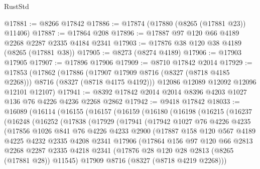 \begin{lexlean}{RustStd}
\begin{coremodule}
@17881 := @8266 @17842
@17886 := @17874 (@17880 (@8265 (@17881 @23)) @11406)
@17887 := @17864 @208
@17896 := @17887 @97 @120 @66 @4189 @2268 @2287 @2335 @4184 @2341
@17903 := @17876 @38 @120 @38 @4189 (@8265 (@17881 @38))
@17905 := @8273 (@8274 @4189)
@17906 := @17903 @17905
@17907 := @17896 @17906
@17909 := @8710 @17842 @2014
@17929 := @17853
    (@17862
      (@17886 (@17907 @17909 @8716 (@8327 (@8718 @4185 @2268))) @8716 (@8327 (@8718 @4175 @4192)))
      @12086
      @12089
      @12092
      @12096
      @12101
      @12107)
@17941 := @8392 @17842 @2014 @2014 @8396 @4203 @1027 @136 @76 @4226 @4236 @2268 @2862
@17942 := @9418 @17842
@18033 := @16089
    (@16114
      (@16155
        (@16157
          (@16159
            (@16180
              (@16198
                (@16215
                  (@16237
                    (@16248
                      (@16252
                        (@17838
                          (@17929
                            (@17941
                              (@17942
                                @1027
                                @76
                                @4226
                                @4235
                                (@17856
                                  @1026
                                  @841
                                  @76
                                  @4226
                                  @4233
                                  @2900
                                  (@17887
                                    @158
                                    @120
                                    @567
                                    @4189
                                    @4225
                                    @4232
                                    @2335
                                    @4208
                                    @2341
                                    @17906
                                    (@17864
                                      @156
                                      @97
                                      @120
                                      @66
                                      @2813
                                      @2268
                                      @2287
                                      @2335
                                      @4218
                                      @2341
                                      (@17876 @28 @120 @28 @2813 (@8265 (@17881 @28)) @11545)
                                      @17909
                                      @8716
                                      (@8327 (@8718 @4219 @2268)))

\end{coremodule}
\end{lexlean}
